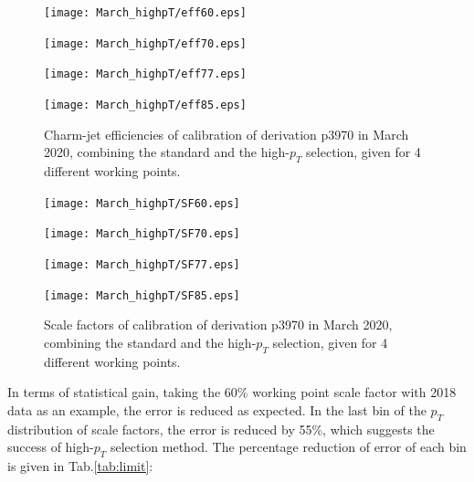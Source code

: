 \documentclass[letterpaper,12pt]{article}
\begin{document}
\begin{figure}[H]
\begin{minipage}[b]{.45\textwidth}
\centering
\texttt{[image: March\_highpT/eff60.eps]}
\end{minipage}\hfill
\begin{minipage}[b]{.45\textwidth}
\centering
\texttt{[image: March\_highpT/eff70.eps]}
\end{minipage}\hfill
\begin{minipage}[b]{.45\textwidth}
\centering
\texttt{[image: March\_highpT/eff77.eps]}
\end{minipage}\hfill
\begin{minipage}[b]{.45\textwidth}
\centering
\texttt{[image: March\_highpT/eff85.eps]}
\end{minipage}
\caption{Charm-jet efficiencies of calibration of derivation p3970 in March 2020, combining the standard 
and the high-$p_{T}$ selection, given for  4 different working points.} \label{fig:March_highpT_eff}
\end{figure}


\begin{figure}[H]
\begin{minipage}[b]{.45\textwidth}
\centering
\texttt{[image: March\_highpT/SF60.eps]}
\end{minipage}\hfill
\begin{minipage}[b]{.45\textwidth}
\centering
\texttt{[image: March\_highpT/SF70.eps]}
\end{minipage}\hfill
\begin{minipage}[b]{.45\textwidth}
\centering
\texttt{[image: March\_highpT/SF77.eps]}
\end{minipage}\hfill
\begin{minipage}[b]{.45\textwidth}
\centering
\texttt{[image: March\_highpT/SF85.eps]}
\end{minipage}
\caption{Scale factors of calibration of derivation p3970 in March 2020, 
combining the standard and the high-$p_{T}$ selection, given for  4 different working points.} \label{fig:March_highpT}
\end{figure}



In terms of statistical gain, taking the 60\% working point scale factor with 2018 data as an example, the error is reduced as expected. In the last bin of the $p_{T}$ distribution of scale factors, the error is reduced by 55\%, which suggests the success of high-$p_{T}$ selection method. The percentage reduction of error of each bin is given in Tab.\ref{tab:limit}:
\end{document}

